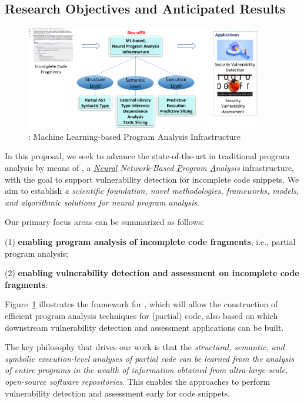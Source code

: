 \subsection{Research Objectives and Anticipated Results}

\begin{figure}[t]
    \centering
    \includegraphics[width=0.92\textwidth]{figures/neuralPA-1.png}
    \caption{{\tool}: Machine Learning-based Program Analysis Infrastructure}
    \label{fig:arch}
\end{figure}


In this proposal, we seek to advance the state-of-the-art in traditional program analysis by means of {\tool}, a {\em \underline{Neural} Network-Based \underline{P}rogram \underline{A}nalysis} infrastructure, with the goal to support vulnerability detection for incomplete code snippets. We aim to establish {\em a scientific foundation, novel methodologies, frameworks, models, and algorithmic solutions for neural program analysis}.

Our primary focus areas can be summarized as follows: 

(1) {\bf enabling program analysis of incomplete code fragments}, i.e., partial program analysis;


(2) {\bf enabling vulnerability detection and assessment on incomplete code fragments}.

\noindent Figure~\ref{fig:arch} illustrates the framework for {\tool},
which will allow the construction of efficient program analysis
techniques for (partial) code, also based on which downstream vulnerability detection and assessment applications can be built.

The key philosophy that drives our work is that the {\em structural,
  semantic, and symbolic execution-level analyses of partial code can
  be learned from the analysis of entire programs in the wealth of
  information obtained from ultra-large-scale, open-source software
  repositories}. This enables the approaches to perform vulnerability
 detection and assessment early for code snippets.


